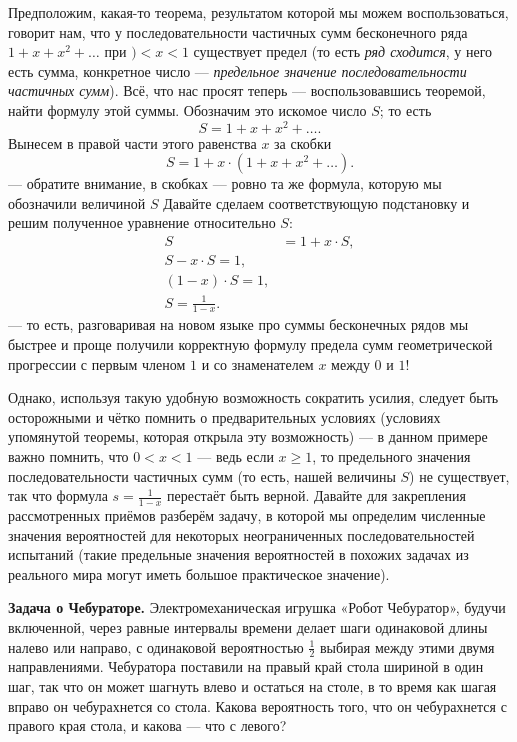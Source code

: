 \documentclass{article}
\begin{document}
Предположим, какая-то теорема, результатом которой мы можем воспользоваться, говорит нам, что у последовательности частичных сумм бесконечного ряда $1+x+x^2+\dots$ при $)<x<1$ существует предел (то есть \emph{ряд сходится}, у него есть сумма, конкретное число --- \emph{предельное значение последовательности частичных сумм}). Всё, что нас просят теперь --- воспользовавшись теоремой, найти формулу этой суммы. 
Обозначим это искомое число $S$;
то есть
\[S=1+x+x^2+\dots.\] 
Вынесем в правой части этого равенства $x$ за скобки
\[S=1+x\cdot(1+x+x^2+\dots).\] 
--- обратите внимание, в скобках --- ровно та же формула, которую мы обозначили величиной $S$ 
Давайте сделаем соответствующую подстановку и решим полученное уравнение относительно $S$:
\begin{align*}
S&=1+x\cdot S,
\\
S-x\cdot S=1,
\\
(1-x)\cdot S=1,
\\
S=\frac1{1-x}.
\end{align*}
--- то есть, разговаривая на новом языке про суммы бесконечных рядов мы быстрее и проще получили корректную формулу предела сумм геометрической прогрессии с первым членом $1$ и со знаменателем $x$ между $0$ и $1$!

Однако, используя такую удобную возможность сократить усилия, 
следует быть осторожными и чётко помнить о предварительных условиях (условиях упомянутой теоремы, которая открыла эту возможность) 
--- в данном примере важно помнить, 
что $0<x<1$ 
--- ведь если $x\ge 1$, то предельного значения последовательности частичных сумм (то есть, нашей величины $S$) не существует, так что формула $s=\tfrac1{1-x}$ перестаёт быть верной.
Давайте для закрепления рассмотренных приёмов разберём задачу, в которой мы определим численные значения вероятностей для некоторых неограниченных последовательностей испытаний (такие предельные значения вероятностей в похожих задачах из реального мира могут иметь большое практическое значение).

\noindent\textbf{Задача о Чебураторе.} 
Электромеханическая игрушка «Робот Чебуратор», 
будучи включенной, через равные интервалы времени делает шаги одинаковой длины налево или направо, с одинаковой вероятностью $\tfrac12$ выбирая между этими двумя направлениями. 
Чебуратора поставили на правый край стола шириной в один шаг, так что он может шагнуть влево и остаться на столе, в то время как шагая вправо он чебурахнется со стола. Какова вероятность того, что он чебурахнется с правого края стола, и какова --- что с левого?
\end{document}
